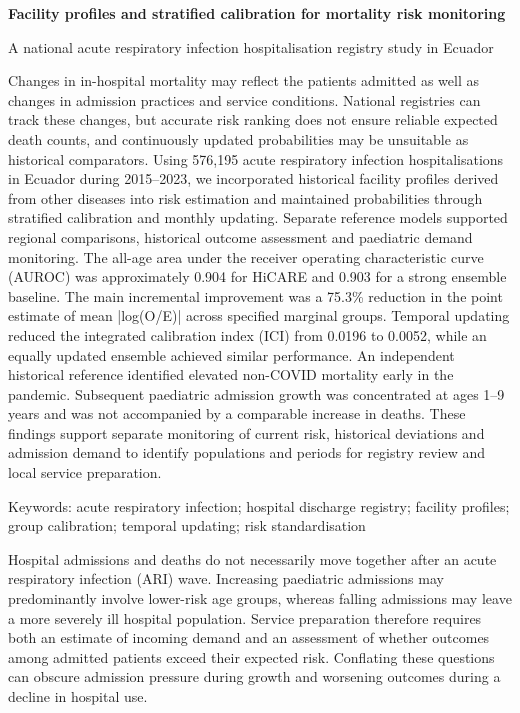 \documentclass[11pt,a4paper]{article}
\newcommand{\mainheading}[1]{\par\needspace{4\baselineskip}\vspace{7pt}{\large\bfseries #1}\par\vspace{3pt}}
\begin{document}
\fontsize{10.5}{13}\selectfont
{\raggedright\LARGE\bfseries Facility profiles and stratified calibration for mortality risk monitoring\par}\vspace{5pt}
{\large A national acute respiratory infection hospitalisation registry study in Ecuador\par}\vspace{10pt}
\mainheading{Abstract}
Changes in in-hospital mortality may reflect the patients admitted as well as changes in admission practices and service conditions. National registries can track these changes, but accurate risk ranking does not ensure reliable expected death counts, and continuously updated probabilities may be unsuitable as historical comparators. Using 576,195 acute respiratory infection hospitalisations in Ecuador during 2015–2023, we incorporated historical facility profiles derived from other diseases into risk estimation and maintained probabilities through stratified calibration and monthly updating. Separate reference models supported regional comparisons, historical outcome assessment and paediatric demand monitoring. The all-age area under the receiver operating characteristic curve (AUROC) was approximately 0.904 for HiCARE and 0.903 for a strong ensemble baseline. The main incremental improvement was a 75.3\% reduction in the point estimate of mean |log(O/E)| across specified marginal groups. Temporal updating reduced the integrated calibration index (ICI) from 0.0196 to 0.0052, while an equally updated ensemble achieved similar performance. An independent historical reference identified elevated non-COVID mortality early in the pandemic. Subsequent paediatric admission growth was concentrated at ages 1–9 years and was not accompanied by a comparable increase in deaths. These findings support separate monitoring of current risk, historical deviations and admission demand to identify populations and periods for registry review and local service preparation.

Keywords: acute respiratory infection; hospital discharge registry; facility profiles; group calibration; temporal updating; risk standardisation

\mainheading{1 Introduction}
Hospital admissions and deaths do not necessarily move together after an acute respiratory infection (ARI) wave. Increasing paediatric admissions may predominantly involve lower-risk age groups, whereas falling admissions may leave a more severely ill hospital population. Service preparation therefore requires both an estimate of incoming demand and an assessment of whether outcomes among admitted patients exceed their expected risk. Conflating these questions can obscure admission pressure during growth and worsening outcomes during a decline in hospital use.
\end{document}
